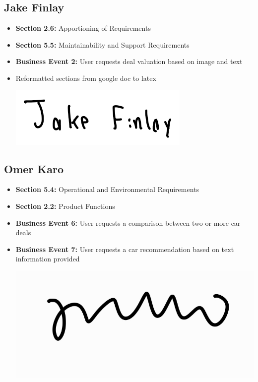 \documentclass[]{article}
\begin{document}
\subsection{Jake Finlay}
\begin{itemize}
    \item \textbf{Section 2.6:} Apportioning of Requirements
    \item \textbf{Section 5.5:} Maintainability and Support Requirements
    \item \textbf{Business Event 2:} User requests deal valuation based on image and text
    \item Reformatted sections from google doc to latex
    \begin{center}
        \includegraphics[scale=0.7]{Images/jake.png}
    \end{center}
\end{itemize}

\subsection{Omer Karo}
\begin{itemize}
    \item \textbf{{Section 5.4:}} Operational and Environmental Requirements
    \item \textbf{{Section 2.2:}} Product Functions
    \item \textbf{{Business Event 6:}} User requests a comparison between two or more car deals
    \item \textbf{{Business Event 7:}} User requests a car recommendation based on text information provided 
    \begin{center}
        \includegraphics[scale=0.1]{Images/omer.jpg}
    \end{center}
\end{itemize}
\end{document}
